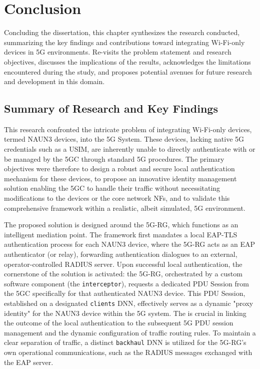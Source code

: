 \chapter{Conclusion}%
\label{chapter:conclusion}

\begin{introduction}
Concluding the dissertation, this chapter synthesizes the research conducted, summarizing the key findings and contributions toward integrating Wi-Fi-only devices in \ac{5G} environments. Re-visits the problem statement and research objectives, discusses the implications of the results, acknowledges the limitations encountered during the study, and proposes potential avenues for future research and development in this domain.
\end{introduction}

\section{Summary of Research and Key Findings}

This research confronted the intricate problem of integrating Wi-Fi-only devices, termed \ac{NAUN3} devices, into the \ac{5G} System. These devices, lacking native \ac{5G} credentials such as a \ac{USIM}, are inherently unable to directly authenticate with or be managed by the \ac{5GC} through standard \ac{5G} procedures. The primary objectives were therefore to design a robust and secure local authentication mechanism for these devices, to propose an innovative identity management solution enabling the \ac{5GC} to handle their traffic without necessitating modifications to the devices or the core network \acp{NF}, and to validate this comprehensive framework within a realistic, albeit simulated, \ac{5G} environment.

The proposed solution is designed around the \ac{5G-RG}, which functions as an intelligent mediation point. The framework first mandates a local \ac{EAP-TLS} authentication process for each \ac{NAUN3} device, where the \ac{5G-RG} acts as an \ac{EAP} authenticator (or relay), forwarding authentication dialogues to an external, operator-controlled \ac{RADIUS} server. Upon successful local authentication, the cornerstone of the solution is activated: the \ac{5G-RG}, orchestrated by a custom software component (the \texttt{interceptor}), requests a dedicated \ac{PDU} Session from the \ac{5GC} specifically for that authenticated \ac{NAUN3} device. This \ac{PDU} Session, established on a designated \texttt{clients} \ac{DNN}, effectively serves as a dynamic "proxy identity" for the \ac{NAUN3} device within the \ac{5G} system. The  is crucial in linking the outcome of the local authentication to the subsequent \ac{5G} \ac{PDU} session management and the dynamic configuration of traffic routing rules. To maintain a clear separation of traffic, a distinct \texttt{backhaul} \ac{DNN} is utilized for the \ac{5G-RG}'s own operational communications, such as the \ac{RADIUS} messages exchanged with the \ac{EAP} server.

